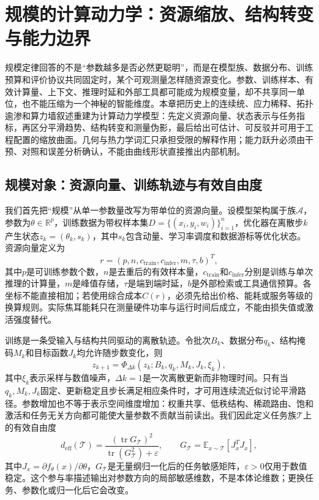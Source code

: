 \chapter{规模的计算动力学：资源缩放、结构转变与能力边界}
\label{chp:geometric_thermodynamics_of_scale}

规模定律回答的不是“参数越多是否必然更聪明”，而是在模型族、数据分布、训练预算和评价协议共同固定时，某个可观测量怎样随资源变化。参数、训练样本、有效计算量、上下文、推理时延和外部工具都可能成为规模变量，却不共享同一单位，也不能压缩为一个神秘的智能维度。本章把历史上的连续统、应力稀释、拓扑逾渗和算力墙叙述重建为计算动力学模型：先定义资源向量、状态表示与任务指标，再区分平滑趋势、结构转变和测量伪影，最后给出可估计、可反驳并可用于工程配置的缩放曲面。几何与热力学词汇只承担受限的解释作用；能力跃升必须由干预、对照和误差分析确认，不能由曲线形状直接推出内部机制。

\section{规模对象：资源向量、训练轨迹与有效自由度}
\label{sec:geometric_essence_of_scale}

我们首先把“规模”从单一参数量改写为带单位的资源向量。设模型架构属于族$\mathcal{A}$，参数为$\theta\in\mathbb{R}^{p}$，训练数据为带权样本集$D=\{(x_i,y_i,w_i)\}_{i=1}^{n}$，优化器在离散步$k$产生状态$z_k=(\theta_k,s_k)$，其中$s_k$包含动量、学习率调度和数据游标等优化状态。资源向量定义为
\begin{equation}
r=(p,n,c_{\mathrm{train}},c_{\mathrm{infer}},m,\tau,b)^T,
\end{equation}
其中$p$是可训练参数个数，$n$是去重后的有效样本量，$c_{\mathrm{train}}$和$c_{\mathrm{infer}}$分别是训练与单次推理的计算量，$m$是峰值存储，$\tau$是端到端时延，$b$是外部检索或工具通信预算。各坐标不能直接相加；若使用综合成本$C(r)$，必须先给出价格、能耗或服务等级的换算规则。实际焦耳能耗只在测量硬件功率与运行时间后成立，不能由损失值或激活强度替代。

训练是一条受输入与结构共同驱动的离散轨迹。令批次$B_k$、数据分布$q_k$、结构掩码$M_k$和目标函数$J_k$均允许随步数变化，则
\begin{equation}
z_{k+1}=\Phi_{\Delta k}\!\left(z_k;B_k,q_k,M_k,J_k,\xi_k\right),
\end{equation}
其中$\xi_k$表示采样与数值噪声，$\Delta k=1$是一次离散更新而非物理时间。只有当$q_k,M_k,J_k$固定、更新稳定且步长满足相应条件时，才可用连续流近似讨论平滑路径。参数增加也不等于表示空间维度增加：权重共享、低秩结构、稀疏路由、饱和激活和任务无关方向都可能使大量参数不贡献当前读出。我们因此定义任务族$\mathcal{T}$上的有效自由度
\begin{equation}
d_{\mathrm{eff}}(\mathcal{T})=
\frac{\left(\operatorname{tr}G_{\mathcal{T}}\right)^2}
{\operatorname{tr}\left(G_{\mathcal{T}}^2\right)+\varepsilon},
\qquad
G_{\mathcal{T}}=\mathbb{E}_{x\sim\mathcal{T}}[J_x^T J_x],
\end{equation}
其中$J_x=\partial f_\theta(x)/\partial\theta$，$G_{\mathcal{T}}$是无量纲归一化后的任务敏感矩阵，$\varepsilon>0$仅用于数值稳定。这个参与率描述输出对参数方向的局部敏感维数，不是本体论维数；更换任务、参数化或归一化后它会改变。

